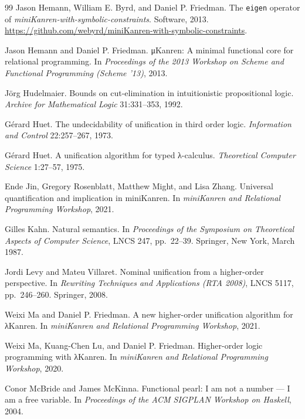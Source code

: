 \begin{thebibliography}{99}
Jason Hemann, William E. Byrd, and Daniel P. Friedman.
\newblock The \texttt{eigen} operator of \emph{miniKanren-with-symbolic-constraints}.
\newblock Software, 2013. \url{https://github.com/webyrd/miniKanren-with-symbolic-constraints}.

Jason Hemann and Daniel P. Friedman.
\newblock μKanren: A minimal functional core for relational programming.
\newblock In \emph{Proceedings of the 2013 Workshop on Scheme and Functional Programming (Scheme '13)},
  2013.

Jörg Hudelmaier.
\newblock Bounds on cut-elimination in intuitionistic propositional logic.
\newblock \emph{Archive for Mathematical Logic} 31:331--353, 1992.

Gérard Huet.
\newblock The undecidability of unification in third order logic.
\newblock \emph{Information and Control} 22:257--267, 1973.

Gérard Huet.
\newblock A unification algorithm for typed λ-calculus.
\newblock \emph{Theoretical Computer Science} 1:27--57, 1975.

Ende Jin, Gregory Rosenblatt, Matthew Might, and Lisa Zhang.
\newblock Universal quantification and implication in miniKanren.
\newblock In \emph{miniKanren and Relational Programming Workshop}, 2021.

Gilles Kahn.
\newblock Natural semantics.
\newblock In \emph{Proceedings of the Symposium on Theoretical Aspects of Computer Science}, LNCS 247,
  pp.~22--39. Springer, New York, March 1987.

Jordi Levy and Mateu Villaret.
\newblock Nominal unification from a higher-order perspective.
\newblock In \emph{Rewriting Techniques and Applications (RTA 2008)}, LNCS 5117, pp.~246--260. Springer,
  2008.

Weixi Ma and Daniel P. Friedman.
\newblock A new higher-order unification algorithm for λKanren.
\newblock In \emph{miniKanren and Relational Programming Workshop}, 2021.

Weixi Ma, Kuang-Chen Lu, and Daniel P. Friedman.
\newblock Higher-order logic programming with λKanren.
\newblock In \emph{miniKanren and Relational Programming Workshop}, 2020.

Conor McBride and James McKinna.
\newblock Functional pearl: I am not a number --- I am a free variable.
\newblock In \emph{Proceedings of the ACM SIGPLAN Workshop on Haskell}, 2004.


\end{thebibliography}
